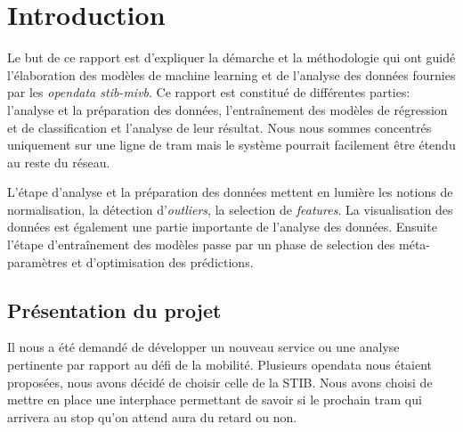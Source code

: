 \chapter{Introduction}
Le but de ce rapport est d'expliquer la démarche et la méthodologie qui ont guidé l'élaboration des modèles de machine learning et de l'analyse des données fournies par les \textit{opendata stib-mivb}. Ce rapport est constitué de différentes parties: l'analyse et la préparation des données, l'entraînement des modèles de régression et de classification et l'analyse de leur résultat. Nous nous sommes concentrés uniquement sur une ligne de tram mais le système pourrait facilement être étendu au reste du réseau.

L'étape d'analyse et la préparation des données mettent en lumière les notions de normalisation, la détection d'\textit{outliers}, la selection de \textit{features}. La visualisation des données est également une partie importante de l'analyse des données. Ensuite l'étape d'entraînement des modèles passe par un phase de selection des méta-paramètres et d'optimisation des prédictions.

\section{Présentation du projet}
Il nous a été demandé de développer un nouveau service ou une analyse pertinente par rapport au défi de la mobilité. Plusieurs opendata nous étaient proposées, nous avons décidé de choisir celle de la STIB. Nous avons choisi de mettre en place une interphace permettant de savoir si le prochain tram qui arrivera au stop qu'on attend aura du retard ou non.